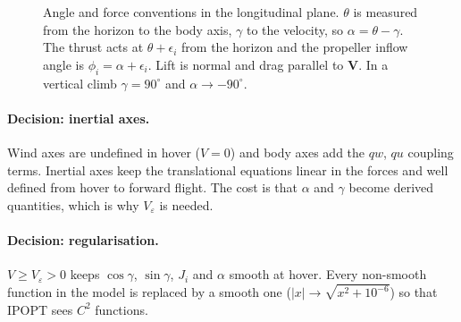 \documentclass[11pt,a4paper]{article}
\begin{document}
\begin{figure}[h]
\centering
{}
\caption{Angle and force conventions in the longitudinal plane. $\theta$ is measured from the
horizon to the body axis, $\gamma$ to the velocity, so $\alpha = \theta - \gamma$. The thrust acts
at $\theta + \epsilon_i$ from the horizon and the propeller inflow angle is $\phi_i = \alpha + \epsilon_i$.
Lift is normal and drag parallel to $\mathbf{V}$. In a vertical climb $\gamma = 90^\circ$ and
$\alpha \to -90^\circ$.}
\label{fig:angles}
\end{figure}

\paragraph{Decision: inertial axes.} Wind axes are undefined in hover ($V=0$) and body axes
add the $qw$, $qu$ coupling terms. Inertial axes keep the translational equations linear in
the forces and well defined from hover to forward flight. The cost is that $\alpha$ and
$\gamma$ become derived quantities, which is why $V_\varepsilon$ is needed.

\paragraph{Decision: regularisation.} $V \ge V_\varepsilon > 0$ keeps $\cos\gamma$, $\sin\gamma$,
$J_i$ and $\alpha$ smooth at hover. Every non-smooth function in the model is replaced by a
smooth one ($|x| \to \sqrt{x^2+10^{-6}}$) so that IPOPT sees $C^2$ functions.
\end{document}
